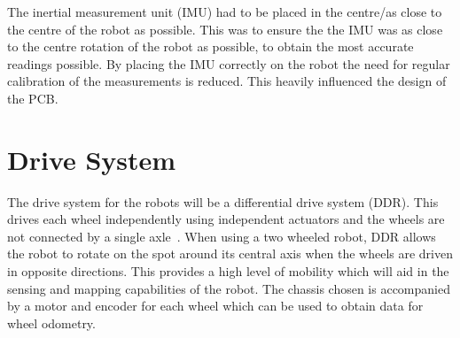 The inertial measurement unit (IMU) had to be placed in the centre/as close to the centre of the robot as possible. This was to 
ensure the the IMU was as close to the centre rotation of the robot as possible, to obtain the most accurate readings possible. 
By placing the IMU correctly on the robot the need for regular calibration of the measurements is reduced. This heavily 
influenced the design of the PCB. 


\section{Drive System}\label{mech/drive}

The drive system for the robots will be a differential drive system (DDR).
This drives each wheel independently using independent actuators and the
wheels are not connected by a single axle~\cite[p.~146]{braunl_embedded_2013}.
When using a two wheeled robot, DDR allows the
robot to rotate on the spot around its central axis when the wheels are
driven in opposite directions. This provides a high level of mobility which
will aid in the sensing and mapping capabilities of the robot. The chassis chosen is accompanied by a motor and encoder for each wheel which can be used to obtain data for wheel odometry. 
